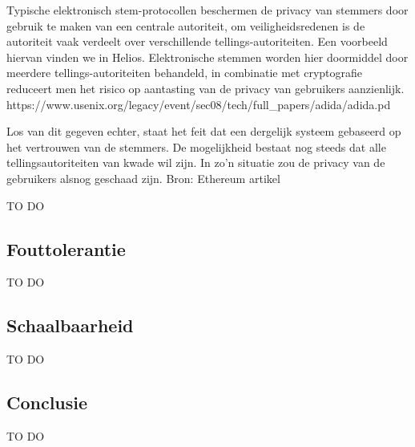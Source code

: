 		Typische elektronisch stem-protocollen beschermen de privacy van stemmers door gebruik te maken van een centrale autoriteit, om veiligheidsredenen is de autoriteit vaak verdeelt over verschillende tellings-autoriteiten. Een voorbeeld hiervan vinden we in Helios. Elektronische stemmen worden hier doormiddel door meerdere tellings-autoriteiten behandeld, in combinatie met cryptografie reduceert men het risico op aantasting van de privacy van gebruikers aanzienlijk. https://www.usenix.org/legacy/event/sec08/tech/full_papers/adida/adida.pd
		
		Los van dit gegeven echter, staat het feit dat een dergelijk systeem gebaseerd op het vertrouwen van de stemmers. De mogelijkheid bestaat nog steeds dat alle tellingsautoriteiten van kwade wil zijn. In zo’n situatie zou de privacy van de gebruikers alsnog geschaad zijn.  Bron: Ethereum artikel
		
		TO DO
	\subsection{Fouttolerantie}
		TO DO
	\subsection{Schaalbaarheid}
		TO DO
	\subsection{Conclusie}
		TO DO
